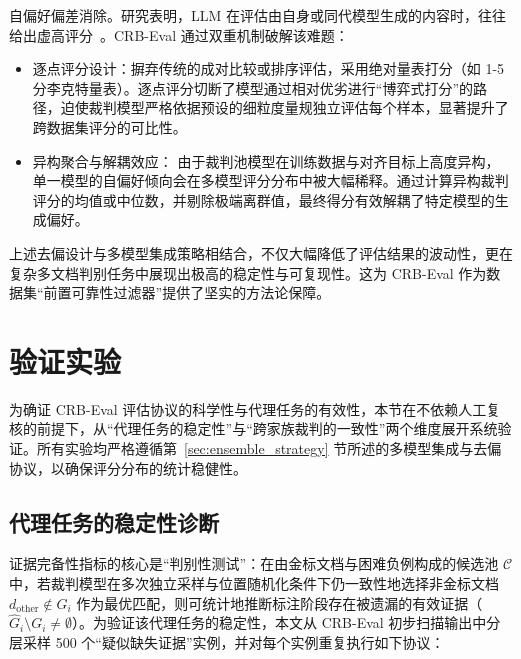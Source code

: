 自偏好偏差消除。研究表明，LLM 在评估由自身或同代模型生成的内容时，往往给出虚高评分~\citep{panickssery2024llm}。CRB-Eval 通过双重机制破解该难题：

\begin{itemize}

    \item 逐点评分设计：摒弃传统的成对比较或排序评估，采用绝对量表打分（如 1-5 分李克特量表）。逐点评分切断了模型通过相对优劣进行“博弈式打分”的路径，迫使裁判模型严格依据预设的细粒度量规独立评估每个样本，显著提升了跨数据集评分的可比性。

    \item 异构聚合与解耦效应： 由于裁判池模型在训练数据与对齐目标上高度异构，单一模型的自偏好倾向会在多模型评分分布中被大幅稀释。通过计算异构裁判评分的均值或中位数，并剔除极端离群值，最终得分有效解耦了特定模型的生成偏好。

\end{itemize}



上述去偏设计与多模型集成策略相结合，不仅大幅降低了评估结果的波动性，更在复杂多文档判别任务中展现出极高的稳定性与可复现性。这为 CRB-Eval 作为数据集“前置可靠性过滤器”提供了坚实的方法论保障。



\section{验证实验}
\label{sec:validation_experiments}



为确证 CRB-Eval 评估协议的科学性与代理任务的有效性，本节在不依赖人工复核的前提下，从“代理任务的稳定性”与“跨家族裁判的一致性”两个维度展开系统验证。所有实验均严格遵循第~\ref{sec:ensemble_strategy} 节所述的多模型集成与去偏协议，以确保评分分布的统计稳健性。



\subsection{代理任务的稳定性诊断}



证据完备性指标的核心是“判别性测试”：在由金标文档与困难负例构成的候选池 $\mathcal{C}$ 中，若裁判模型在多次独立采样与位置随机化条件下仍一致性地选择非金标文档 $d_{\text{other}} \notin G_i$ 作为最优匹配，则可统计地推断标注阶段存在被遗漏的有效证据（$\hat{G}_i \setminus G_i \neq \emptyset$）。为验证该代理任务的稳定性，本文从 CRB-Eval 初步扫描输出中分层采样 500 个“疑似缺失证据”实例，并对每个实例重复执行如下协议：



